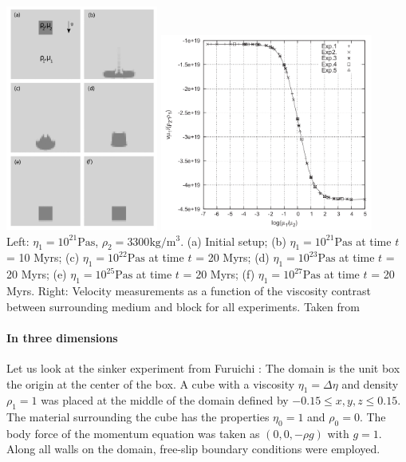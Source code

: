 \begin{center}
\includegraphics[width=5cm]{images/benchmark_sinker/thie11a}
\includegraphics[width=7cm]{images/benchmark_sinker/thie11b}\\
{\captionfont Left: 
$\eta_1 = 10^{21}\si{\pascal\second}$, $\rho_2= 3300\si{\kg\per\cubic\metre}$. 
(a) Initial setup; 
(b) $\eta_1 = 10^{21}\si{\pascal\second}$ at time $t$ = 10 Myrs; 
(c) $\eta_1 = 10^{22}\si{\pascal\second}$ at time $t$ = 20 Myrs; 
(d) $\eta_1 = 10^{23}\si{\pascal\second}$ at time $t$ = 20 Myrs; 
(e) $\eta_1 = 10^{25}\si{\pascal\second}$ at time $t$ = 20 Myrs; 
(f) $\eta_1 = 10^{27}\si{\pascal\second}$ at time $t$ = 20 Myrs. 
Right: Velocity measurements as a function of the viscosity contrast between
surrounding medium and block for all experiments.
Taken from \cite{thie11}}
\end{center}

\paragraph{In three dimensions}
Let us look at the sinker experiment from Furuichi \etal \cite{fumt11}: 
The domain is the unit box the origin at the center of the box. A cube with a viscosity $\eta_1=\Delta \eta$ 
and density $\rho_1 = 1$ was placed at the middle of the domain defined by
$-0.15 \leq x,y,z \leq 0.15$.
The material surrounding the cube has the properties $\eta_0=1$ and $\rho_0 = 0$. 
The body force of the momentum equation was taken as $(0, 0,-\rho g)$ with $g = 1$.
Along all walls on the domain, free-slip boundary conditions were employed.

